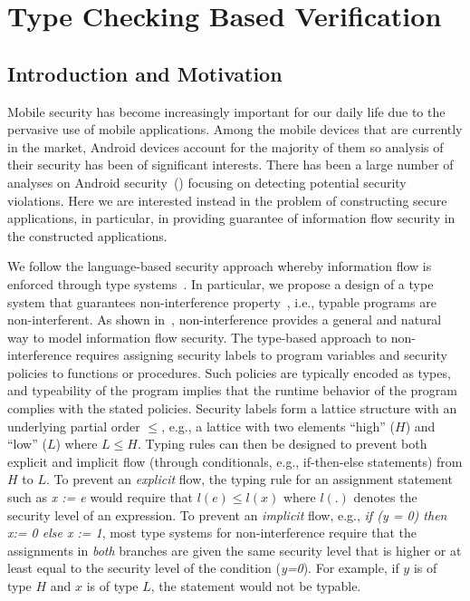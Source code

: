 
\chapter{Type Checking Based Verification} \label{ch:sta}

\section{Introduction and Motivation}\label{sec:sta_intro}

Mobile security has become increasingly important for our daily life due to the pervasive use of mobile applications.
Among the mobile devices that are currently in the market, Android devices account for the majority of them so analysis of their security
has been of significant interests. There has been a large number of analyses on Android security~(\cite{Enck:2009:UAS:1512148.1512324, Fuchs2010, Arzt:2014:FPC:2666356.2594299, Wei:2014:APG:2660267.2660357, Li:2015:IDI:2818754.2818791}) focusing on detecting potential security violations. Here we are interested instead in the problem of constructing secure applications,
in particular, in providing guarantee of information flow security in the constructed applications. 
 
We follow the language-based security approach whereby
information flow is enforced through type systems~\cite{Denning:1976cl,Denning:1977hwa,Volpano:1996,Sabelfeld:2003}.
In particular, we propose a design of a type system that
guarantees non-interference property~\cite{Volpano:1996}, i.e., typable
programs are non-interferent. As shown in~\cite{Goguen:1982ta}, non-interference provides
a general and natural way to model information flow security.
The type-based approach to non-interference requires assigning
security labels to program variables and security policies to functions or procedures. Such policies
are typically encoded as types, and typeability of the program implies that the runtime behavior of
the program complies with the stated policies.
Security labels form a lattice structure with an underlying partial order $\leq$,
e.g., a lattice with two elements ``high'' ($H$) and ``low'' ($L$) where $L \leq H$.
Typing rules can then be designed to prevent both explicit
and implicit flow (through conditionals, e.g., if-then-else statements) from $H$ to $L$.
To prevent an \emph{explicit} flow, the typing rule for an assignment statement
such as \textit{x := e} would require that $l(e) \leq l(x)$ where $l(.)$
denotes the security level of an expression. To prevent an \emph{implicit} flow, e.g.,
\textit{if (y = 0) then x:= 0 else x := 1},
most type systems for non-interference require that
the assignments in \emph{both} branches are given the same
security level that is higher or at least equal to the security level of the condition (\emph{y=0}). 
For example, if $y$ is of type $H$ and $x$ is of type $L$, the statement would not be typable.

